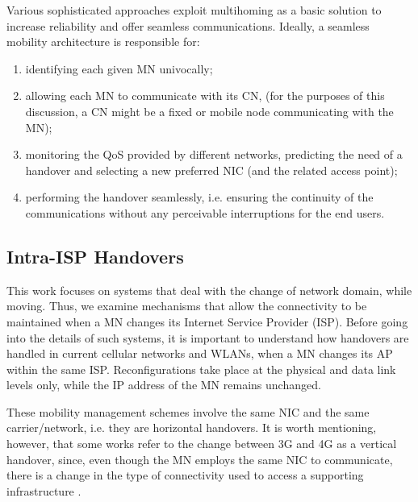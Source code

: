 \documentclass[preprint,12pt]{elsarticle}
\begin{document}
Various sophisticated approaches exploit multihoming as a basic solution to increase 
reliability and offer seamless communications. Ideally, a 
seamless mobility architecture is responsible for: 
\begin{enumerate}
  \item identifying each given MN univocally; 
  \item allowing each MN to communicate with its \ac{CN}, (for the purposes 
of this discussion, a CN might be a fixed or mobile node communicating with 
the MN); 
  \item monitoring the QoS provided by different networks, predicting the need of a handover and selecting a new preferred NIC (and the related access point);
  \item performing the handover seamlessly, i.e. ensuring the continuity of the 
communications without any perceivable interruptions for the end users. 
\end{enumerate}

\subsection{Intra-ISP Handovers}
This work focuses on systems that deal with the change of network domain, while moving. Thus, we examine mechanisms that allow the connectivity to be maintained when a MN changes its Internet Service Provider (ISP). 
Before going into the details of such systems, it is important to understand how handovers are handled in current cellular networks and WLANs, when a MN changes its AP within the same ISP. Reconfigurations take place at the physical and data link levels only, while the IP address of the MN remains unchanged.


These mobility management schemes involve the same NIC and the same 
carrier/network, i.e. they are horizontal handovers. 
It is worth mentioning, however, that some works refer to the change between 3G 
and 4G as a vertical handover, since, even though the MN employs the same NIC to 
communicate, there is a change in the type of connectivity used to access a
supporting infrastructure  \cite{Tu:2014}.
\end{document}
